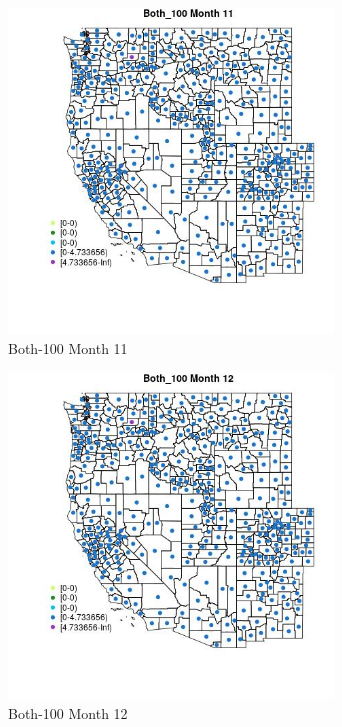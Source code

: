 \begin{figure} 
\centering  
\includegraphics[width=0.77\textwidth]{Code_Outputs/df_report_ML_predictors_CountyCentroid_Locations_Dates_2008-01-01to2018-12-31_MapObsMo11Both_100.jpg} 
\caption{\label{fig:df_report_ML_predictors_CountyCentroid_Locations_Dates_2008-01-01to2018-12-31MapObsMo11Both_100}Both-100 Month 11} 
\end{figure} 
 

\begin{figure} 
\centering  
\includegraphics[width=0.77\textwidth]{Code_Outputs/df_report_ML_predictors_CountyCentroid_Locations_Dates_2008-01-01to2018-12-31_MapObsMo12Both_100.jpg} 
\caption{\label{fig:df_report_ML_predictors_CountyCentroid_Locations_Dates_2008-01-01to2018-12-31MapObsMo12Both_100}Both-100 Month 12} 
\end{figure} 
 

